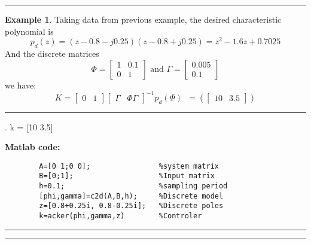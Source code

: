 \documentclass[nols]{tufte-handout}
\theoremstyle{definition}
\newtheorem{exmp}{Example}[section]
\begin{document}
\vspace{1cm}
\hrule height 1pt
\begin{exmp} 
    Taking data from previous example, the desired characteristic polynomial is
\[
p_{d}(z)=(z-0.8-j0.25)(z-0.8+j0.25)=z^{2}-1.6z+0.7025
\]
And the discrete matrices
\[
    \Phi=
    \begin{bmatrix} 
1 & 0.1\\
0 & 1
\end{bmatrix}
\text{ and }
\Gamma=
\begin{bmatrix}
0.005\\
0.1
\end{bmatrix}
\]
we have:
\[
K=
\begin{bmatrix}
0 & 1
\end{bmatrix}
\begin{bmatrix}
\Gamma & \Phi\Gamma
\end{bmatrix}^{-1}p_{d}\left( \Phi \right) \,\,\, = \left(
\begin{bmatrix}
10 & 3.5
\end{bmatrix}
\right)
\]

    \noindent\hfil\rule{\textwidth}{.4pt}\hfil
       \begin{verbbox}[\footnotesize]
                                                            .           
k =
[10  3.5]

    \end{verbbox} 
\textbf{Matlab code:}
    \begin{verbatim}
        A=[0 1;0 0];                %system matrix
        B=[0;1];                    %Input matrix
        h=0.1;                      %sampling period
        [phi,gamma]=c2d(A,B,h);     %Discrete model
        z=[0.8+0.25i, 0.8-0.25i];   %Discrete poles
        k=acker(phi,gamma,z)        %Controler
    \end{verbatim}
    \noindent\hfil\rule{\textwidth}{.4pt}\hfil 

\end{exmp}
\hrule height 1pt
\vspace{1cm}

\ifx \fillibre \undefined
\end{document}

